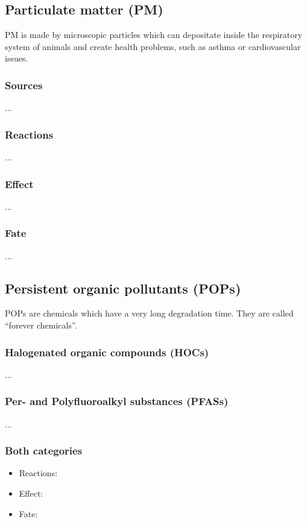 \documentclass{article}
\begin{document}
\subsection{Particulate matter (PM)}
PM is made by microscopic particles which can depositate inside the
respiratory system of animals and create health problems, such as asthma
or cardiovascular issues.

\subsubsection{Sources}
...

\subsubsection{Reactions}
...

\subsubsection{Effect}
...

\subsubsection{Fate}
... 

\subsection{Persistent organic pollutants (POPs)}
POPs are chemicals which have a very long degradation time. They are called
``forever chemicals''.

\subsubsection{Halogenated organic compounds (HOCs)}
...

\subsubsection{Per- and Polyfluoroalkyl substances (PFASs)}
...

\subsubsection{Both categories}
\begin{itemize}
    \item Reactions:
    \item Effect:
    \item Fate:
\end{itemize}
\end{document}
